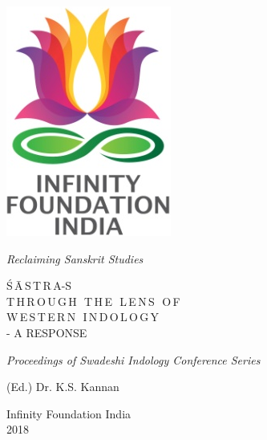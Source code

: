 \thispagestyle{empty}
\begin{center}
\includegraphics[scale=0.3]{figures/logo.png}
\bigskip

{\fontsize{10}{14}\selectfont\sl
Reclaiming Sanskrit Studies}

\bigskip
\end{center}
\medskip

\begin{center}
{\fontsize{20}{24}\selectfont Ś\,Ā\,S\,T\,R\,A-S\\ T\,H\,R\,O\,U\,G\,H\,\, T\,H\,E\,\, L\,E\,N\,S\,\, O\,F\\[7pt] W\,E\,S\,T\,E\,R\,N\,\, I\,N\,D\,O\,L\,O\,G\,Y}\\[8pt]
{\fontsize{15}{24}\selectfont - A RESPONSE}
\bigskip

{\sl\small Proceedings of Swadeshi Indology Conference Series}
\bigskip
\bigskip

{\fontsize{14}{18}\selectfont 
(Ed.) Dr. K.S. Kannan\par
}
\vfill

{\fontsize{12}{14}\selectfont
Infinity Foundation India\\[4pt]
2018}
\end{center}




